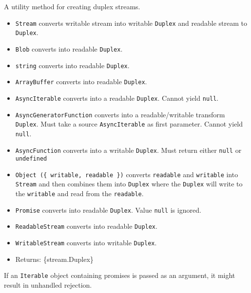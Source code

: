 A utility method for creating duplex streams.

\begin{itemize}
\tightlist
\item
  \texttt{Stream} converts writable stream into writable \texttt{Duplex}
  and readable stream to \texttt{Duplex}.
\item
  \texttt{Blob} converts into readable \texttt{Duplex}.
\item
  \texttt{string} converts into readable \texttt{Duplex}.
\item
  \texttt{ArrayBuffer} converts into readable \texttt{Duplex}.
\item
  \texttt{AsyncIterable} converts into a readable \texttt{Duplex}.
  Cannot yield \texttt{null}.
\item
  \texttt{AsyncGeneratorFunction} converts into a readable/writable
  transform \texttt{Duplex}. Must take a source \texttt{AsyncIterable}
  as first parameter. Cannot yield \texttt{null}.
\item
  \texttt{AsyncFunction} converts into a writable \texttt{Duplex}. Must
  return either \texttt{null} or \texttt{undefined}
\item
  \texttt{Object\ (\{\ writable,\ readable\ \})} converts
  \texttt{readable} and \texttt{writable} into \texttt{Stream} and then
  combines them into \texttt{Duplex} where the \texttt{Duplex} will
  write to the \texttt{writable} and read from the \texttt{readable}.
\item
  \texttt{Promise} converts into readable \texttt{Duplex}. Value
  \texttt{null} is ignored.
\item
  \texttt{ReadableStream} converts into readable \texttt{Duplex}.
\item
  \texttt{WritableStream} converts into writable \texttt{Duplex}.
\item
  Returns: \{stream.Duplex\}
\end{itemize}

If an \texttt{Iterable} object containing promises is passed as an
argument, it might result in unhandled rejection.

